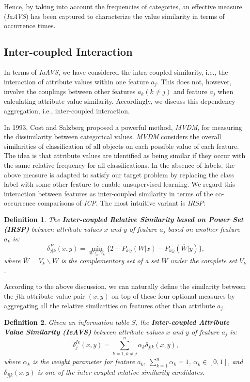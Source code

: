\documentclass{article}
\newtheorem{Def}{Definition}[section]
\numberwithin{equation}{section}
\begin{document}
Hence, by taking into account the frequencies of categories, an effective measure (\emph{IaAVS}) has been captured to characterize the value similarity in terms of occurrence times.

\subsection{Inter-coupled Interaction}

In terms of \emph{IaAVS}, we have considered the intra-coupled similarity, i.e., the interaction of attribute values within one feature $a_j$. This does not, however, involve the couplings between other features $a_k(k\neq j)$ and feature $a_j$ when calculating attribute value similarity. Accordingly, we discuss this dependency aggregation, i.e., inter-coupled interaction.

In 1993, Cost and Salzberg \cite{Cost:1993} proposed a powerful method, \emph{MVDM}, for measuring the dissimilarity between categorical values. \emph{MVDM} considers the overall similarities of classification of all objects on each possible value of each feature. The idea is that attribute values are identified as being similar if they occur with the same relative frequency for all classifications. In the absence of labels, the above measure is adapted to satisfy our target problem by replacing the class label with some other feature to enable unsupervised learning. We regard this interaction between features as inter-coupled similarity in terms of the co-occurrence comparisons of \emph{ICP}. The most intuitive variant is \emph{IRSP}:

\begin{Def}
The \textbf{Inter-coupled Relative Similarity based on Power Set (IRSP)} between attribute values $x$  and $y$ of feature $a_j$  based on another feature $a_k$ is:
\begin{equation}
\delta_{j|k}^P(x,y)=\min_{W\subseteq V_k}\{2-P_{k|j}(W|x)-P_{k|j}(\overline{W}|y)\},
\label{eq:IRSP}
\end{equation}
where $\overline{W}=V_k\backslash W$ is the complementary set of a set $W$ under the complete set $V_k$.
\end{Def}

According to the above discussion, we can naturally define the similarity between the $j$th attribute value pair $(x,y)$ on top of these four optional measures by aggregating all the relative similarities on features other than attribute $a_j$.

\begin{Def}
\label{def:IeAVS}
Given an information table $S$, the \textbf{Inter-coupled Attribute Value Similarity (IeAVS)} between attribute values $x$  and $y$ of feature $a_j$ is:
\begin{equation}
\delta_{j}^{Ie}(x,y)=\sum_{k=1,k\neq j}^n\alpha_k\delta_{j|k}(x,y),
\label{eq:IeAVS}
\end{equation}
where $\alpha_k$ is the weight parameter for feature $a_k$, $\sum_{k=1}^n\alpha_k=1$, $\alpha_k\in[0,1]$, and $\delta_{j|k}(x,y)$ is one of the inter-coupled relative similarity candidates.
\end{Def}
\end{document}
